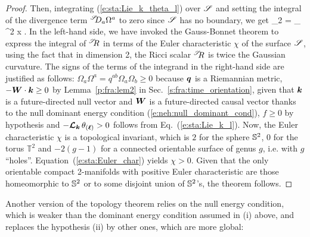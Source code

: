 \begin{proof}
Then, integrating (\ref{e:sta:Lie_k_theta_l}) over $\mathscr{S}$
and setting the integral of the divergence term ${}^{\mathscr{S}}\!\!D_a \Omega^a$ to zero since
$\mathscr{S}$ has no boundary, we get
\be \label{e:sta:Euler_char}
    _{2\pi\chi} = \int_\Sp {}
           \, \D^2 x .
\ee
In the left-hand side, we have invoked the Gauss-Bonnet theorem
to express the integral of ${}^{\mathscr{S}}\!\! R$ in terms
of the Euler characteristic $\chi$ of the
surface $\mathscr{S}$, using the fact that in dimension 2,
the Ricci scalar ${}^{\mathscr{S}}\!\! R$ is twice the
Gaussian curvature.
The signs of the terms of the integrand in the right-hand side
are justified as follows:
$\Omega_a \Omega^a = q^{ab} \Omega_a \Omega_b \geq 0$ because $\bm{q}$ is a Riemannian metric,
$- \bm{W}\cdot\bm{k} \geq 0$ by Lemma~\ref{p:fra:lem2} in Sec.~\ref{s:fra:time_orientation},
given that $\bm{k}$ is a future-directed null vector and $\bm{W}$ is a future-directed
causal vector thanks to the null dominant energy condition (\ref{e:neh:null_dominant_cond}),
$f\geq 0$ by hypothesis and $- \bm{\mathcal{L}}_{\bm{k}}\, \theta_{(\bm{\ell})} > 0$
follows from Eq.~(\ref{e:sta:Lie_k_l}). Now, the Euler characteristic $\chi$ is a topological
invariant, which is $2$ for the sphere $\mathbb{S}^2$, $0$ for the torus $\mathbb{T}^2$
and $-2(g-1)$
for a connected orientable surface of genus $g$, i.e. with $g$ ``holes''.
Equation~(\ref{e:sta:Euler_char}) yields $\chi > 0$. Given that the only orientable
compact 2-manifolds
with positive Euler characteristic are those homeomorphic to $\mathbb{S}^2$ or
to some disjoint union of $\mathbb{S}^2$'s, the theorem follows.
\end{proof}

Another version of the topology theorem relies on the null energy
condition, which is weaker than the dominant energy condition assumed in (i) above,
and replaces the hypothesis (ii) by other ones, which are more global:

